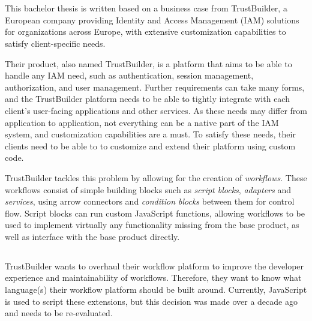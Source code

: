 
\chapter{}%
\label{ch:inleiding}

This bachelor thesis is written based on a business case from TrustBuilder, a European company providing Identity and Access Management (IAM) solutions for organizations across Europe, with extensive customization capabilities to satisfy client-specific needs.

Their product, also named TrustBuilder, is a platform that aims to be able to handle any IAM need, such as authentication, session management, authorization, and user management. Further requirements can take many forms, and the TrustBuilder platform needs to be able to tightly integrate with each client’s user-facing applications and other services. As these needs may differ from application to application, not everything can be a native part of the IAM system, and customization capabilities are a must. To satisfy these needs, their clients need to be able to to customize and extend their platform using custom code.

TrustBuilder tackles this problem by allowing for the creation of \emph{workflows}. These workflows consist of simple building blocks such as \emph{script blocks}, \emph{adapters} and \emph{services}, using arrow connectors and \emph{condition blocks} between them for control flow. Script blocks can run custom JavaScript functions, allowing workflows to be used to implement virtually any functionality missing from the base product, as well as interface with the base product directly.

\section{}%
\label{sec:probleemstelling}

TrustBuilder wants to overhaul their workflow platform to improve the developer experience and maintainability of workflows. Therefore, they want to know what language(s) their workflow platform should be built around. Currently, JavaScript is used to script these extensions, but this decision was made over a decade ago and needs to be re-evaluated.

